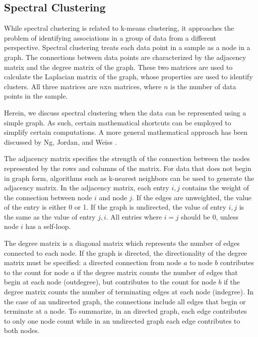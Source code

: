 \subsection{Spectral Clustering}

While spectral clustering is related to k-means clustering, it approaches the problem of identifying associations in a group of data from a different perspective. Spectral clustering treats each data point in a sample as a node in a graph. The connections between data points are characterized by the adjacency matrix and the degree matrix of the graph. These two matrices are used to calculate the Laplacian matrix of the graph, whose properties are used to identify clusters. All three matrices are $n$x$n$ matrices, where $n$ is the number of data points in the sample. 

Herein, we discuss spectral clustering when the data can be represented using a simple graph. As such, certain mathematical shortcuts can be employed to simplify certain computations. A more general mathematical approach has been discussed by Ng, Jordan, and Weiss \cite{Ng2002}.

The adjacency matrix specifies the strength of the connection between the nodes represented by the rows and columns of the matrix. For data that does not begin in graph form, algorithms such as k-nearest neighbors can be used to generate the adjacency matrix. In the adjacency matrix, each entry $i, j$ contains the weight of the connection between node $i$ and node $j$. If the edges are unweighted, the value of the entry is either 0 or 1. If the graph is undirected, the value of entry $i, j$ is the same as the value of entry $j, i$. All entries where $i=j$ should be 0, unless node $i$ has a self-loop.

The degree matrix is a diagonal matrix which represents the number of edges connected to each node. If the graph is directed, the directionality of the degree matrix must be specified: a directed connection from node $a$ to node $b$ contributes to the count for node $a$ if the degree matrix counts the number of edges that begin at each node (outdegree), but contributes to the count for node $b$ if the degree matrix counts the number of terminating edges at each node (indegree). In the case of an undirected graph, the connections include all edges that begin or terminate at a node. To summarize, in an directed graph, each edge contributes to only one node count while in an undirected graph each edge contributes to both nodes.

